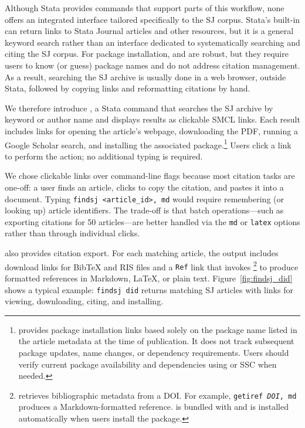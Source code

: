 Although Stata provides commands that support parts of this workflow, none offers an integrated interface tailored specifically to the SJ corpus. Stata's built-in  can return links to Stata Journal articles and other resources, but it is a general keyword search rather than an interface dedicated to systematically searching and citing the SJ corpus. For package installation,  and  are robust, but they require users to know (or guess) package names and do not address citation management. As a result, searching the SJ archive is usually done in a web browser, outside Stata, followed by copying links and reformatting citations by hand.

We therefore introduce , a Stata command that searches the SJ archive by keyword or author name and displays results as clickable SMCL links. Each result includes links for opening the article's webpage, downloading the PDF, running a Google Scholar search, and installing the associated package.\footnote{ provides package installation links based solely on the package name listed in the article metadata at the time of publication. It does not track subsequent package updates, name changes, or dependency requirements. Users should verify current package availability and dependencies using  or SSC when needed.} Users click a link to perform the action; no additional typing is required.

We chose clickable links over command-line flags because most citation tasks are one-off: a user finds an article, clicks to copy the citation, and pastes it into a document. Typing \texttt{findsj <article\_id>, md} would require remembering (or looking up) article identifiers. The trade-off is that batch operations---such as exporting citations for 50 articles---are better handled via the \texttt{md} or \texttt{latex} options rather than through individual clicks.

 also provides citation export. For each matching article, the output includes download links for BibTeX and RIS files and a {\tt Ref} link that invokes \footnote{ \citep{getiref} retrieves bibliographic metadata from a DOI. For example, {\tt getiref \textit{DOI}, md} produces a Markdown-formatted reference.  is bundled with  and is installed automatically when users install the package.} to produce formatted references in Markdown, \LaTeX, or plain text. Figure~\ref{fig:findsj_did} shows a typical example: {\tt findsj did} returns matching SJ articles with links for viewing, downloading, citing, and installing.

